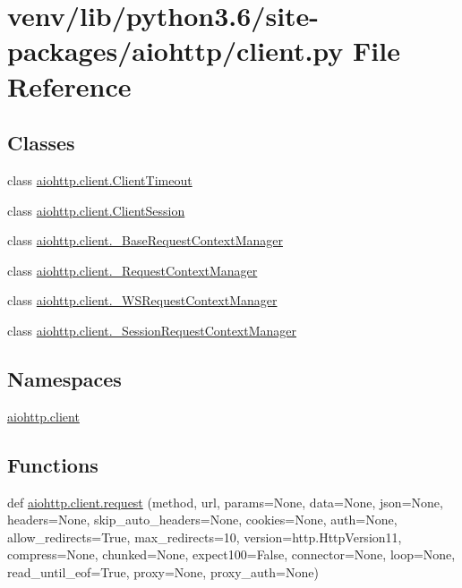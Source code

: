 \hypertarget{venv_2lib_2python3_86_2site-packages_2aiohttp_2client_8py}{}\section{venv/lib/python3.6/site-\/packages/aiohttp/client.py File Reference}
\label{venv_2lib_2python3_86_2site-packages_2aiohttp_2client_8py}
\subsection*{Classes}
\begin{DoxyCompactItemize}
\item 
class \hyperlink{classaiohttp_1_1client_1_1_client_timeout}{aiohttp.\+client.\+Client\+Timeout}
\item 
class \hyperlink{classaiohttp_1_1client_1_1_client_session}{aiohttp.\+client.\+Client\+Session}
\item 
class \hyperlink{classaiohttp_1_1client_1_1___base_request_context_manager}{aiohttp.\+client.\+\_\+\+Base\+Request\+Context\+Manager}
\item 
class \hyperlink{classaiohttp_1_1client_1_1___request_context_manager}{aiohttp.\+client.\+\_\+\+Request\+Context\+Manager}
\item 
class \hyperlink{classaiohttp_1_1client_1_1___w_s_request_context_manager}{aiohttp.\+client.\+\_\+\+W\+S\+Request\+Context\+Manager}
\item 
class \hyperlink{classaiohttp_1_1client_1_1___session_request_context_manager}{aiohttp.\+client.\+\_\+\+Session\+Request\+Context\+Manager}
\end{DoxyCompactItemize}
\subsection*{Namespaces}
\begin{DoxyCompactItemize}
\item 
 \hyperlink{namespaceaiohttp_1_1client}{aiohttp.\+client}
\end{DoxyCompactItemize}
\subsection*{Functions}
\begin{DoxyCompactItemize}
\item 
def \hyperlink{namespaceaiohttp_1_1client_ab0f1d0a5569ca9cc2986e7e43380c049}{aiohttp.\+client.\+request} (method, url, params=None, data=None, json=None, headers=None, skip\+\_\+auto\+\_\+headers=None, cookies=None, auth=None, allow\+\_\+redirects=True, max\+\_\+redirects=10, version=http.\+Http\+Version11, compress=None, chunked=None, expect100=False, connector=None, loop=None, read\+\_\+until\+\_\+eof=True, proxy=None, proxy\+\_\+auth=None)
\end{DoxyCompactItemize}
